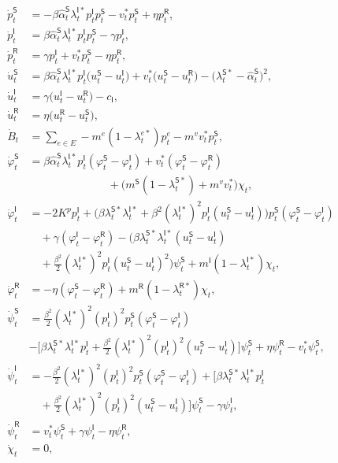 \documentclass[10pt,a4paper]{amsart}
\def\sI{\mathsf{I}}
\def\sR{\mathsf{R}}
\def\sS{\mathsf{S}}
\begin{document}
\begin{align}
        \dot p_t^\sS&=-\beta\hat{\alpha}_t^\sS\lambda_t^{\sI*}p_t^\sI p_t^\sS-v^*_t p_t^\sS+\eta p_t^\sR,\nonumber\\
\dot p_t^\sI&=\beta\hat{\alpha}_t^\sS \lambda_t^{\sI*}p_t^\sI p_t^\sS-\gamma p_t^\sI,\nonumber\\
\dot p_t^\sR&=\gamma p_t^\sI+v_t^*p_t^\sS-\eta p_t^\sR,\nonumber \\
\dot u_t^\sS&=\beta\hat{\alpha}_t^\sS \lambda_t^{\sI*}p_t^\sI\big(u_t^\sS-u_t^\sI\big)+v^*_t\big(u_t^\sS-u_t^\sR\big) - \big(\lambda_t^{\sS*}-\hat{\alpha}_t^\sS\big)^2,\nonumber\\
\dot u_t^\sI&=\gamma\big(u_t^\sI-u_t^\sR\big)-c_{\sI},\nonumber\\
\dot u_t^\sR&=\eta\big(u_t^\sR-u_t^\sS\big),\nonumber\\
\dot B_t &= \sum_{e\in E} - m^e(1 - \lambda_t^{e*}) p_t^e
- m^{v}v^{*}_{t} p_t^\sS, \nonumber\\
\dot{\varphi}_t^\sS&=\beta\hat{\alpha}_t^\sS \lambda_t^{\sI*} p_t^\sI (\varphi_t^\sS - \varphi_t^\sI)+v_t^*(\varphi_t^\sS - \varphi_t^\sR)\nonumber\\&\hspace{3cm}+\big(m^\sS(1-\lambda_t^{\sS*})+ m^v v_t^*\big)\chi_t, \nonumber\\
\dot{\varphi}_t^\sI&=-2 K^p p_t^\sI+\Big(\beta \lambda_t^{\sS*} \lambda_t^{\sI*}+\beta^2(\lambda_t^{\sI*})^2 p_t^\sI (u_t^\sS-u_t^\sI)\Big) p_t^\sS (\varphi_t^\sS-\varphi_t^\sI)\nonumber\\&\quad+\gamma(\varphi_t^\sI-\varphi_t^\sR)
-\Big(\beta \lambda_t^{\sS*} \lambda_t^{\sI*} (u_t^\sS-u_t^\sI) \nonumber\\ &\quad +\frac{\beta^2}{2}(\lambda_t^{\sI*})^2 p_t^\sI(u_t^\sS-u_t^\sI)^2\Big)\psi_t^\sS+ m^\sI (1-\lambda_t^{\sI*})\chi_t, \nonumber\\
\dot{\varphi}_t^\sR&=-\eta(\varphi_t^\sS-\varphi_t^\sR)+ m^\sR(1-\lambda_t^{\sR*})\chi_t,\nonumber \\
\dot{\psi}_t^\sS&=\frac{\beta^2}{2}(\lambda_t^{\sI*})^2 (p_t^\sI)^2 p_t^\sS (\varphi_t^\sS-\varphi_t^\sI)\nonumber \\ &-\Big[\beta \lambda_t^{\sS*} \lambda_t^{\sI*} p_t^\sI+\frac{\beta^2}{2}(\lambda_t^{\sI*})^2 (p_t^\sI)^2 (u_t^\sS-u_t^\sI)\Big] \psi_t^\sS+\eta \psi_t^\sR - v^*_t \psi_t^\sS,\nonumber \\
\dot{\psi}_t^\sI&=-\frac{\beta^2}{2}(\lambda_t^{\sI*})^2 (p_t^\sI)^2 p_t^\sS(\varphi_t^\sS-\varphi_t^\sI)+\Big[\beta \lambda_t^{\sS*} \lambda_t^{\sI*} p_t^\sI\nonumber\\&\quad+\frac{\beta^2}{2}(\lambda_t^{\sI*})^2 (p_t^\sI)^2 (u_t^\sS-u_t^\sI)\Big] \psi_t^\sS-\gamma \psi_t^\sI,\nonumber \\
\dot{\psi}_t^\sR&=v^*_t \psi_t^\sS+\gamma \psi_t^\sI -\eta \psi_t^\sR,\nonumber \\
\dot{\chi}_t&=0,\label{eq:smfe_fbode}
\end{align}
\end{document}
